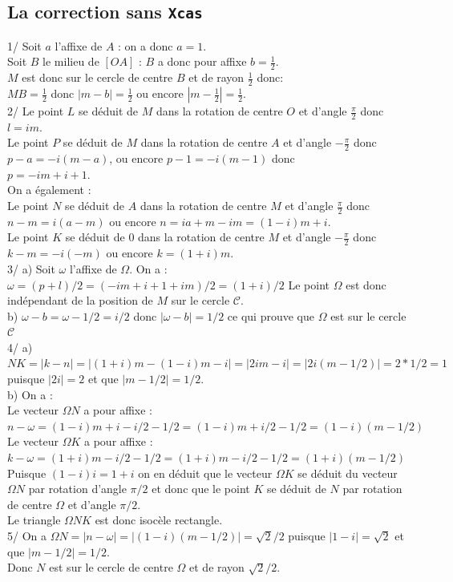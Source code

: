 \documentclass[a4paper,11pt]{book}
\begin{document}
\subsection{La correction sans {\tt Xcas}}
1/ Soit $a$ l'affixe de $A$ : on a donc $a=1$.\\
Soit $B$ le milieu de $[OA]$ : $B$ a donc pour affixe $b=\frac{1}{2}$.\\
$M$ est donc sur le cercle de centre $B$ et de rayon $\frac{1}{2}$ donc:\\
$MB=\frac{1}{2}$ donc $|m-b|=\frac{1}{2}$ ou encore 
$|m-\frac{1}{2}|=\frac{1}{2}$.\\
2/ Le point $L$ se d\'eduit de $M$ dans la rotation de centre $O$ et d'angle
$\frac{\pi}{2}$ donc $l=im$.\\
 Le point $P$ se d\'eduit de $M$ dans la rotation de centre $A$ et d'angle
$-\frac{\pi}{2}$ donc $p-a=-i(m-a)$, ou encore $p-1=-i(m-1)$ donc \\
$p=-im+i+1$.\\
On a \'egalement :\\
Le point $N$ se d\'eduit de $A$ dans la rotation de centre $M$ et d'angle
$\frac{\pi}{2}$ donc $n-m=i(a-m)$ ou encore $n=ia+m-im=(1-i)m+i$.\\
Le point $K$ se d\'eduit de $0$ dans la rotation de centre $M$ et d'angle
$-\frac{\pi}{2}$ donc $k-m=-i(-m)$ ou encore $k=(1+i)m$.\\
3/ a) Soit $\omega$ l'affixe de $\Omega$. On a :\\
$\omega=(p+l)/2=(-im+i+1+im)/2=(1+i)/2$
Le point $\Omega$ est donc ind\'ependant de la position de $M$ sur le cercle 
$\mathcal C$.\\ 
\hspace*{0.4cm} b) $\omega-b=\omega-1/2=i/2$ donc  $|\omega-b|=1/2$ ce qui 
prouve que $\Omega$ est sur le cercle $\mathcal C$\\
4/ a) $NK=|k-n|=|(1+i)m-(1-i)m-i|=|2im-i|=|2i(m-1/2)|=2*1/2=1$ puisque $|2i|=2$ et
 que $|m-1/2|=1/2$.\\
\hspace*{0.4cm} b) On a :\\
Le vecteur $\Omega N$ a pour affixe :\\
$n-\omega=(1-i)m+i-i/2-1/2=(1-i)m+i/2-1/2=(1-i)(m-1/2)$\\
Le vecteur $\Omega K$ a pour affixe :\\
$k-\omega=(1+i)m-i/2-1/2=(1+i)m-i/2-1/2=(1+i)(m-1/2)$\\
Puisque $(1-i)i=1+i$ on en d\'eduit que le vecteur $\Omega K$ se d\'eduit
du vecteur $\Omega N$ par rotation d'angle $\pi/2$ et donc que le point 
$K$ se d\'eduit de $N$ par rotation de centre $\Omega$ et d'angle $\pi/2$.\\
Le triangle $\Omega NK$ est donc isoc\`ele rectangle.\\
5/ On a  $\Omega N=|n-\omega|=|(1-i)(m-1/2)|=\sqrt 2/2$ puisque
$|1-i|=\sqrt 2$ et que $|m-1/2|=1/2$.\\
Donc $N$ est sur le cercle de centre $\Omega$ et de rayon $\sqrt 2/2$.
\end{document}
